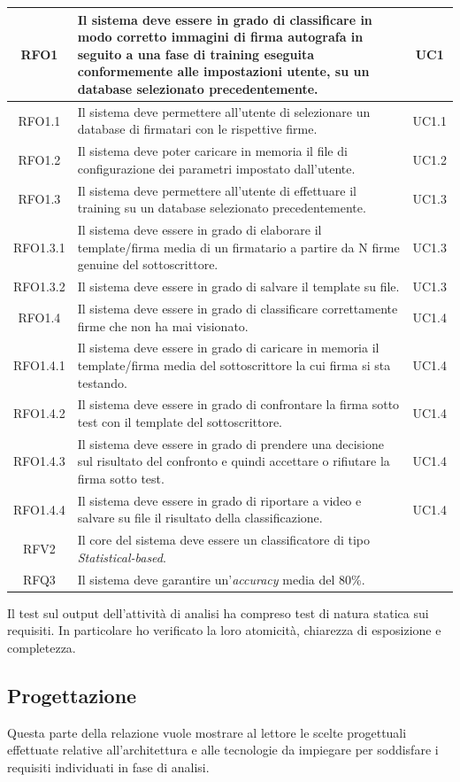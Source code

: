 \begin{longtable}{|c|p{9cm}|c|}
\midrule
RFO1
& Il sistema deve essere in grado di classificare in modo corretto immagini di firma autografa in seguito a una fase di training eseguita conformemente alle impostazioni utente, su un database selezionato precedentemente.
& UC1
\\
\midrule
RFO1.1
& Il sistema deve permettere all'utente di selezionare un database di firmatari con le rispettive firme.
& UC1.1
\\
\midrule
RFO1.2
& Il sistema deve poter caricare in memoria il file di configurazione dei parametri impostato dall'utente.
& UC1.2
\\
\midrule
RFO1.3
&  Il sistema deve permettere all'utente di effettuare il training su un database selezionato precedentemente.
& UC1.3
\\
\midrule
RFO1.3.1
& Il sistema deve essere in grado di elaborare il template/firma media di un firmatario a partire da N firme genuine del sottoscrittore.
& UC1.3
\\
\midrule
RFO1.3.2
& Il sistema deve essere in grado di salvare il template su file.
& UC1.3
\\
\midrule
RFO1.4
& Il sistema deve essere in grado di classificare correttamente firme che non ha mai visionato.
& UC1.4
\\
\midrule
RFO1.4.1
& Il sistema deve essere in grado di caricare in memoria il template/firma media del sottoscrittore la cui firma si sta testando.
& UC1.4
\\
\midrule
RFO1.4.2
& Il sistema deve essere in grado di confrontare la firma sotto test con il template del sottoscrittore.
& UC1.4
\\
\midrule
RFO1.4.3
& Il sistema deve essere in grado di prendere una decisione sul risultato del confronto e quindi accettare o rifiutare la firma sotto test.
& UC1.4
\\
\midrule
RFO1.4.4
& Il sistema deve essere in grado di riportare a video e salvare su file il risultato della classificazione.
& UC1.4
\\
\midrule
RFV2
& Il core del sistema deve essere un classificatore di tipo \emph{Statistical-based}.
&
\\
\midrule
RFQ3
& Il sistema deve garantire un'\emph{accuracy} media del 80\%.
& 
\end{longtable}
Il test sul output dell'attività di analisi ha compreso test di natura statica sui requisiti. In particolare ho verificato la loro atomicità, chiarezza di esposizione e completezza.
\subsection{Progettazione}
\label{3.3}
Questa parte della relazione vuole mostrare al lettore le scelte progettuali effettuate relative all'architettura e alle tecnologie da impiegare per soddisfare i requisiti individuati in fase di analisi.
